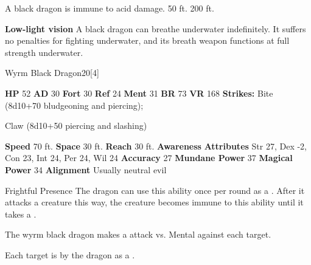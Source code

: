       
       A black dragon is immune to acid damage.
     50 ft.
     200 ft.
    \par\noindent\textbf{Low-light vision}
        A black dragon can breathe underwater indefinitely.
        It suffers no penalties for fighting underwater, and its breath weapon functions at full strength underwater.
  

  \begin{monsubsection}{Wyrm Black Dragon}{20}[4]
    \vspace{-1em}\vspace{-1em}
    \vspace{0em}

    
    

    \begin{spellcontent}
      \begin{spelltargetinginfo}
        \pari \textbf{HP} 52 \monsep
          \textbf{AD} 30 \monsep
          \textbf{Fort} 30 \monsep
          \textbf{Ref} 24 \monsep
          \textbf{Ment} 31
        \pari \textbf{BR} 73 \monsep
        \textbf{VR} 168
        \pari \textbf{Strikes:}
            Bite  (8d10+70 bludgeoning and piercing);
\par Claw  (8d10+50 piercing and slashing)
      \end{spelltargetinginfo}
    \end{spellcontent}
    \begin{monsterfooter}
      \pari \textbf{Speed} 70 ft. \monsep
        \textbf{Space} 30 ft. \monsep
        \textbf{Reach} 30 ft.
      \pari \textbf{Awareness} 
      \pari \textbf{Attributes}
        Str 27, Dex -2,
        Con 23, Int 24,
        Per 24, Wil 24
      \pari \textbf{Accuracy} 27 \monsep
        \textbf{Mundane Power} 37 \monsep
      \textbf{Magical Power} 34
      \pari \textbf{Alignment} Usually neutral evil
    \end{monsterfooter}
  \end{monsubsection}
  \begin{freeability}{Frightful Presence}
      The dragon can use this ability once per round as a .
      After it attacks a creature this way, the creature becomes immune to this ability until it takes a .
      \par The wyrm black dragon makes a  attack
        vs. Mental against each target.
    
    \hit Each target is  by the dragon as a .
    \end{freeability}
  

